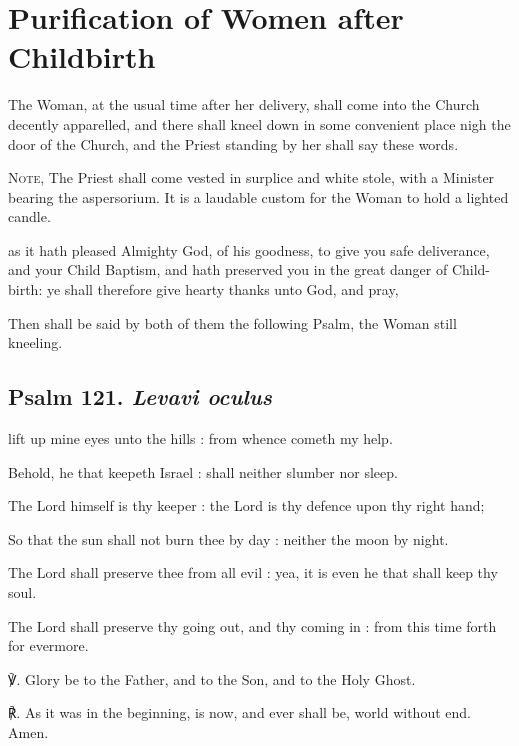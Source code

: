 \section{Purification of Women after Childbirth}
\fancyhead[RE,LO]{}
\begin{secrubric}
	The Woman, at the usual time after her delivery, shall come into the Church decently apparelled, and there shall kneel down in some convenient place nigh the door of the Church, and the Priest standing by her shall say these words.\par
	\textsc{Note,} The Priest shall come vested in surplice and white stole, with a Minister bearing the aspersorium. It is a laudable custom for the Woman to hold a lighted candle.
\end{secrubric}

 as it hath pleased Almighty God, of his goodness, to give you safe deliverance, and your Child Baptism, and hath preserved you in the great danger of Child-birth: ye shall therefore give hearty thanks unto God, and pray,
\begin{rubric}
	Then shall be said by both of them the following Psalm, the Woman still kneeling.
\end{rubric}
\subsection{Psalm 121. \textit{Levavi oculus}}

 lift up mine eyes unto the hills : from whence cometh my help.\par
{}
Behold, he that keepeth Israel : shall neither slumber nor sleep.\par
{}The Lord himself is thy keeper : the Lord is thy defence upon thy right hand;\par
{}So that the sun shall not burn thee by day : neither the moon by night.\par
{}The Lord shall preserve thee from all evil : yea, it is even he that shall keep thy soul.\par
{}The Lord shall preserve thy going out, and thy coming in : from this time forth for evermore.\par
℣. Glory be to the Father, and to the Son, and to the Holy Ghost.\par
℟. As it was in the beginning, is now, and ever shall be, world without end. Amen.\\


